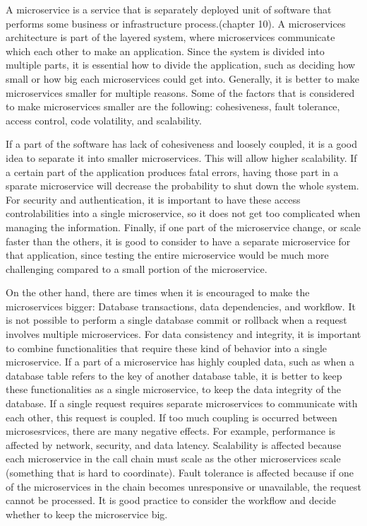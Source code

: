 A microservice is a service that is separately deployed unit of software that performs some business or infrastructure process.(chapter 10).
A microservices architecture is part of the layered system, where microservices communicate which each other to make an application. 
Since the system is divided into multiple parts, it is essential how to divide the application, 
such as deciding how small or how big each microservices could get into. Generally, it is better to make microservices smaller for 
multiple reasons. Some of the factors that is considered to make microservices 
smaller are the following: cohesiveness, fault tolerance, access control, code volatility, and scalability. 

If a part of the software has lack of cohesiveness and loosely coupled, it is a good idea to separate it into smaller microservices. 
This will allow higher scalability. If a certain part of the application produces fatal errors, 
having those part in a sparate microservice will decrease the probability to shut down the whole system. 
For security and authentication, it is important to have these access controlabilities into a single microservice, 
so it does not get too complicated when managing the information. Finally, if one part of the microservice change, 
or scale faster than the others, it is good to consider to have a separate microservice for that application, 
since testing the entire microservice would be much more challenging compared to a small portion of the microservice. 

On the other hand, there are times when it is encouraged to make the microservices bigger: Database transactions, data dependencies, and workflow. 
It is not possible to perform a single database commit or rollback when a request involves multiple microservices. 
For data consistency and integrity, it is important to combine functionalities that require these kind of behavior into a single microservice. 
If a part of a microservice has highly coupled data, such as when a database table refers to  the key of another database table, 
it is better to keep these functionalities as a single microservice, to keep the data integrity of the database. 
If a single request requires separate microservices to communicate with each other, this request is coupled. 
If too much coupling is occurred between microsesrvices, there are many negative effects. 
For example, performance is affected by network, security, and data latency. 
Scalability is affected because each microservice in the call chain must scale as the other microservices scale (something that is hard to coordinate).
Fault tolerance is affected because if one of the microservices in the chain becomes unresponsive or unavailable, the request cannot be processed.
It is good practice to consider the workflow and decide whether to keep the microservice big.\\

